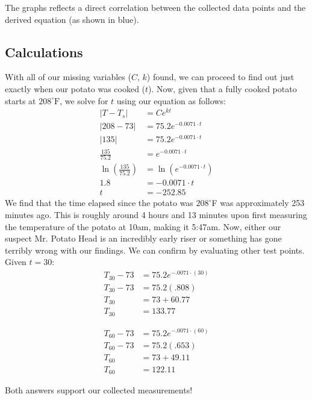 \documentclass{article}
\begin{document}
The graphs reflects a direct correlation between the collected data points and the derived equation (as shown in blue).

\newpage
\subsection{Calculations}
With all of our missing variables ($C$, $k$) found, we can proceed to find out just exactly when our potato was cooked ($t$). Now, given that a fully cooked potato starts at $208^\circ\text{F}$, we solve for $t$ using our equation as follows:
\begin{align}
    |T-T_s| &= Ce^{kt}\\[1em]
    |208 - 73| &= 75.2e^{-0.0071\cdot t}\\[1em]
    |135| &=  75.2e^{-0.0071\cdot t}\\[1em]
    \frac{135}{75.2} &= e^{-0.0071\cdot t}\\[1em]
    \ln{\left(\frac{135}{75.2}\right)} &= \ln{\left(e^{-0.0071\cdot t}\right)}\\[1em]
    1.8 &= -0.0071\cdot t\\[1em]
    t &= -252.85
\end{align}
We find that the time elapsed since the potato was $208^\circ$F was approximately 253 minutes ago. This is roughly around 4 hours and 13 minutes upon first measuring the temperature of the potato at 10am, making it 5:47am. Now, either our suspect Mr. Potato Head is an incredibly early riser or something has gone terribly wrong with our findings. We can confirm by evaluating other test points.\\ 

Given $t=30$:
\begin{align}
    T_{30}-73 &= 75.2e^{-.0071\cdot(30)}\\
    T_{30}-73 &= 75.2(.808)\\
    T_{30} &= 73+60.77\\
    T_{30} &= 133.77
\end{align}


\begin{align}
    T_{60}-73 &= 75.2e^{-.0071\cdot(60)}\\
    T_{60}-73 &= 75.2(.653)\\
    T_{60} &= 73+49.11\\
    T_{60} &= 122.11
\end{align}

Both answers support our collected measurements!
\end{document}

